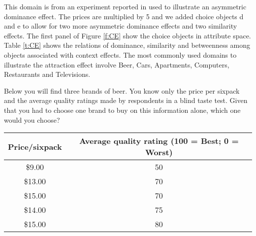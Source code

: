 This domain is from an experiment reported in  used to illustrate an asymmetric dominance effect.
The prices are multiplied by 5 and we added choice objects d and e to allow for two more asymmetric dominance effects and two similarity effects.
The first panel of Figure \ref{f:CE} show the choice objects in attribute space.
Table \ref{t:CE} shows the relations of dominance, similarity and betweenness among objects associated with context effects.
The most commonly used domains to illustrate the attraction effect involve Beer, Cars, Apartments, Computers, Restaurants and Televisions.

\begin{tcolorbox}
Below you will find three brands of beer.
You know only the price per sixpack and the average quality ratings made by respondents in a blind taste test.
Given that you had to choose one brand to buy on this information alone, which one would you choose?

\begin{tabular}{cc}
\hline
Price/sixpack & Average quality rating (100 = Best; 0 = Worst) \\ 
\hline
\$9.00 & 50 \\ 
\$13.00 & 70 \\ 
\$15.00 & 70 \\ 
\$14.00 & 75 \\ 
\$15.00 & 80 \\ \hline
\end{tabular}
\end{tcolorbox}
